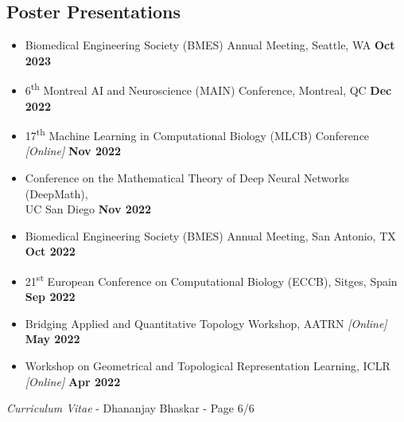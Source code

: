 \documentclass[margin,line]{res}
\begin{document}
\begin{resume}
\section{\sc Poster Presentations}
{\renewcommand\leftmargini{0em}
\begin{itemize}
\setlength\itemsep{0.3em}
\item[] Biomedical Engineering Society (BMES) Annual Meeting, Seattle, WA \hfill {\bf \small  Oct 2023}
\item[] 6\textsuperscript{th} Montreal AI and Neuroscience (MAIN) Conference, Montreal, QC \hfill {\bf \small  Dec 2022}
\item[] 17\textsuperscript{th} Machine Learning in Computational Biology (MLCB) Conference \textit{[Online]} \hfill {\bf \small  Nov 2022}
\item[] Conference on the Mathematical Theory of Deep Neural Networks (DeepMath), \\ UC San Diego \hfill {\bf \small  Nov 2022}
\item[] Biomedical Engineering Society (BMES) Annual Meeting, San Antonio, TX \hfill {\bf \small  Oct 2022}
\item[] 21\textsuperscript{st} European Conference on Computational Biology (ECCB), Sitges, Spain \hfill {\bf \small  Sep 2022}
\item[] Bridging Applied and Quantitative Topology Workshop, AATRN \textit{[Online]} \hfill {\bf \small  May 2022}
\item[] Workshop on Geometrical and Topological Representation Learning, ICLR \textit{[Online]} \hfill {\bf \small  Apr 2022} 
\end{itemize}
}

\newpage
\begin{flushright}
\textit{Curriculum Vitae} - Dhananjay Bhaskar - Page 6/6
\end{flushright}
\vspace*{.02cm}


\end{resume}
\end{document}
